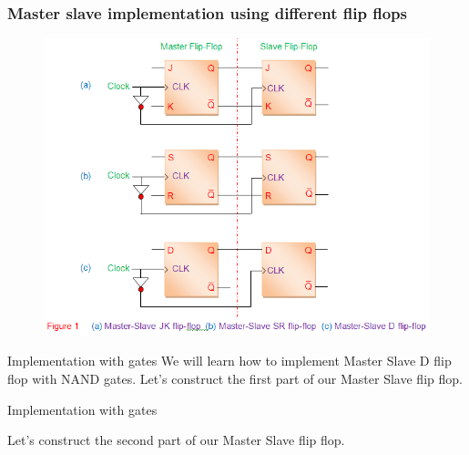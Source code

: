 \documentclass{beamer}
\begin{document}
\begin{frame}
\frametitle{Master slave implementation using different flip flops}
\begin{figure}[h]
    \includegraphics[scale=.45]{msffs.PNG}
\end{figure}
\end{frame}


\begin{frame}{Implementation with gates}
    We will learn how to implement Master Slave D flip flop with NAND gates.\newline \pause
    Let's construct the first part of our Master Slave flip flop.\pause
    \begin{figure}[H]
        \centering
        
        
        
        
        \label{fig:my_label}
    \end{figure}
    
\end{frame}

\begin{frame}{Implementation with gates}
   
    Let's construct the second part of our Master Slave flip flop.\pause
    \begin{figure}[H]
        \centering
        
        
        
        
        \label{fig:my_label}
    \end{figure}
    
\end{frame}
\end{document}
